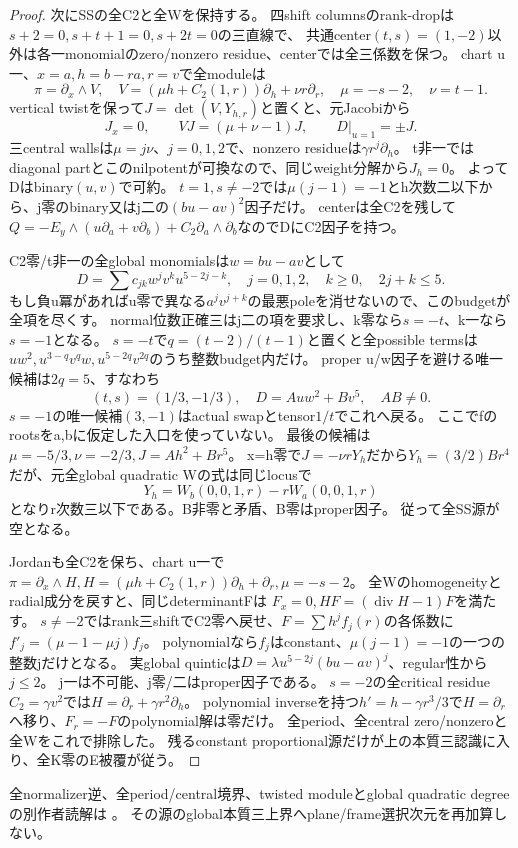\documentclass[a4paper,11pt]{ltjsarticle}
\theoremstyle{definition}
\begin{document}
\begin{proof}
次にSSの全C2と全Wを保持する。
四shift columnsのrank-dropは$s+2=0,s+t+1=0,s+2t=0$の三直線で、
共通center$(t,s)=(1,-2)$以外は各一monomialのzero/nonzero residue、centerでは全三係数を保つ。
chart u一、$x=a,h=b-ra,r=v$で全moduleは
\[
 \pi=\partial_x\wedge V,\quad
 V=(\mu h+C_2(1,r))\partial_h+\nu r\partial_r,
 \quad\mu=-s-2,\quad\nu=t-1.
\]
vertical twistを保って$J=\det(V,Y_{h,r})$と置くと、元Jacobiから
\[
 J_x=0,\qquad VJ=(\mu+\nu-1)J,\qquad D|_{u=1}=\pm J.
\]
三central wallsは$\mu=j\nu$、$j=0,1,2$で、nonzero residueは$\gamma r^j\partial_h$。
t非一ではdiagonal partとこのnilpotentが可換なので、同じweight分解から$J_h=0$。
よってDはbinary$(u,v)$で可約。
$t=1,s\ne-2$では$\mu(j-1)=-1$とh次数二以下から、j零のbinary又はj二の$(bu-av)^2$因子だけ。
centerは全C2を残して$Q=-E_y\wedge(u\partial_a+v\partial_b)+C_2\partial_a\wedge\partial_b$なのでDにC2因子を持つ。

C2零/t非一の全global monomialsは$w=bu-av$として
\[
 D=\sum c_{jk}w^jv^ku^{5-2j-k},\quad
 j=0,1,2,\quad k\ge0,\quad2j+k\le5.
\]
もし負u冪があればu零で異なる$a^jv^{j+k}$の最悪poleを消せないので、このbudgetが全項を尽くす。
normal位数正確三はj二の項を要求し、k零なら$s=-t$、k一なら$s=-1$となる。
$s=-t$で$q=(t-2)/(t-1)$と置くと全possible termsは
$uw^2,u^{3-q}v^qw,u^{5-2q}v^{2q}$のうち整数budget内だけ。
proper u/w因子を避ける唯一候補は$2q=5$、すなわち
\[
 (t,s)=(1/3,-1/3),\quad D=Auw^2+Bv^5,\quad AB\ne0.
\]
$s=-1$の唯一候補$(3,-1)$はactual swapとtensor$1/t$でこれへ戻る。
ここでfのrootsをa,bに仮定した入口を使っていない。
最後の候補は$\mu=-5/3,\nu=-2/3,J=Ah^2+Br^5$。
x=h零で$J=-\nu rY_h$だから$Y_h=(3/2)Br^4$だが、元全global quadratic Wの式は同じlocusで
\[
 Y_h=W_b(0,0,1,r)-rW_a(0,0,1,r)
\]
となりr次数三以下である。B非零と矛盾、B零はproper因子。
従って全SS源が空となる。

Jordanも全C2を保ち、chart u一で
$\pi=\partial_x\wedge H,H=(\mu h+C_2(1,r))\partial_h+\partial_r,\mu=-s-2$。
全Wのhomogeneityとradial成分を戻すと、同じdeterminantFは
$F_x=0,HF=(\operatorname{div}H-1)F$を満たす。
$s\ne-2$ではrank三shiftでC2零へ戻せ、$F=\sum h^jf_j(r)$の各係数に
$f'_j=(\mu-1-\mu j)f_j$。
polynomialなら$f_j$はconstant、$\mu(j-1)=-1$の一つの整数jだけとなる。
実global quinticは$D=\lambda u^{5-2j}(bu-av)^j$、regular性から$j\le2$。
j一は不可能、j零/二はproper因子である。
$s=-2$の全critical residue$C_2=\gamma v^2$では$H=\partial_r+\gamma r^2\partial_h$。
polynomial inverseを持つ$h'=h-\gamma r^3/3$で$H=\partial_r$へ移り、$F_r=-F$のpolynomial解は零だけ。
全period、全central zero/nonzeroと全Wをこれで排除した。
残るconstant proportional源だけが上の本質三認識に入り、全K零のE被覆が従う。
\end{proof}
全normalizer逆、全period/central境界、twisted moduleとglobal quadratic degreeの別作者読解は
。
その源のglobal本質三上界へplane/frame選択次元を再加算しない。
\end{document}
